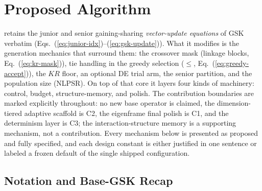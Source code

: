 \section{Proposed \dtgsk{} Algorithm}\label{sec:algorithm}

\dtgsk{} retains the junior and senior gaining-sharing \emph{vector-update
equations} of GSK verbatim (Eqs.~(\ref{eq:junior-idx})--(\ref{eq:gsk-update})).
What it modifies is the generation mechanics that surround them: the crossover
mask (linkage blocks, Eq.~(\ref{eq:kr-mask})), tie handling in the greedy
selection ($\le$, Eq.~(\ref{eq:greedy-accept})), the $KR$ floor, an optional
DE trial arm, the senior partition, and the population size (NLPSR). On top of
that core it layers four kinds of machinery: control, budget, structure-memory,
and polish. %
The contribution boundaries are marked explicitly throughout: no new base
operator is claimed, the dimension-tiered adaptive scaffold is C2, the
eigenframe final polish is C1, and the determinism layer is C3; the
interaction-structure memory is a supporting mechanism, not a contribution.
Every mechanism below is presented as proposed and fully specified, and
each design constant is either justified in one sentence or labeled a
frozen default of the single shipped configuration.

\subsection{Notation and Base-GSK Recap}\label{sec:alg:notation}

